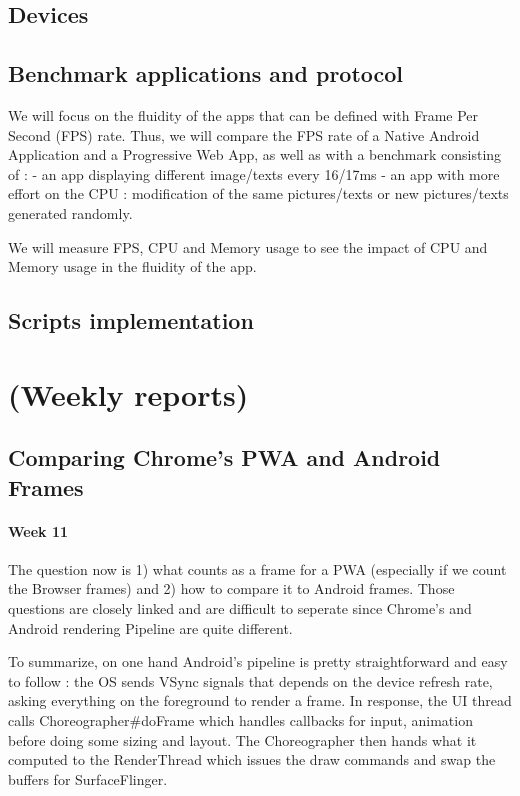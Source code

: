 \documentclass{kththesis}
\begin{document}
    \subsection{Devices}
    \subsection{Benchmark applications and protocol}

We will focus on the fluidity of the apps that can be defined with Frame Per Second (FPS) rate.
Thus, we will compare the FPS rate of a Native Android Application and a Progressive Web App, as well as with a benchmark consisting of : 
    - an app displaying different image/texts every 16/17ms
    - an app with more effort on the CPU : modification of the same pictures/texts or new pictures/texts generated randomly.
\newline

We will measure FPS, CPU and Memory usage to see the impact of CPU and Memory usage in the fluidity of the app.
\newline

\subsection{Scripts implementation}

\iffalse
\section{(Weekly reports)}
\subsection{Comparing Chrome's PWA and Android Frames}
\paragraph{Week 11}
The question now is 1) what counts as a frame for a PWA (especially if we count the Browser frames) and 2) how to compare it to Android frames.
Those questions are closely linked and are difficult to seperate since Chrome's and Android rendering Pipeline are quite different.

To summarize, on one hand Android's pipeline is pretty straightforward and easy to follow : the OS sends VSync signals that depends on the device refresh rate, asking everything on the foreground to render a frame. In response, the UI thread calls Choreographer\#doFrame which handles callbacks for input, animation before doing some sizing and layout. The Choreographer then hands what it computed to the RenderThread which issues the draw commands and swap the buffers for SurfaceFlinger.
\end{document}
